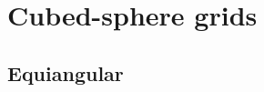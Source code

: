 
\chapter{Cubed-sphere grids}
\citep{sadourny:1972}
\citep{ronchi:1996}
\citep{rancic:1996}
\citep{taylor:1997}
\citep{nair:2005}
\citep{lauritzen:2011}
\section{Equiangular}

